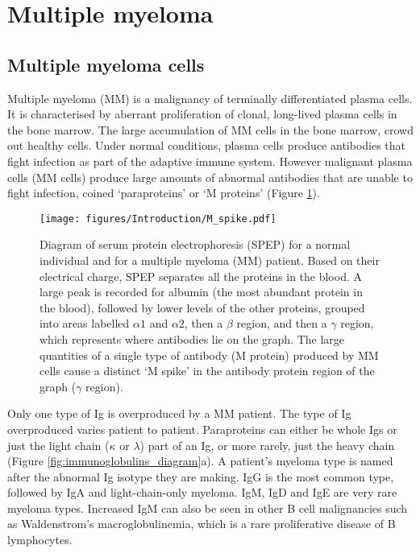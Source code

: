 \section{Multiple myeloma}\label{sec:MM}
\subsection{Multiple myeloma cells}
Multiple myeloma (MM) is a malignancy of terminally differentiated plasma cells.
It is characterised by aberrant proliferation of clonal, long-lived plasma cells in the bone marrow\cite{anderson2011pathogenesis}.
The large accumulation of MM cells in the bone marrow, crowd out healthy cells.
Under normal conditions, plasma cells produce antibodies that fight infection as part of the adaptive immune system.
However malignant plasma cells (MM cells) produce large amounts of abnormal antibodies that are unable to fight infection, coined `paraproteins' or `M proteins' (Figure \ref{fig:m_spike}).
%
\begin{figure}[htb]
\centering
\texttt{[image: figures/Introduction/M\_spike.pdf]}
\caption[M spike diagram]{Diagram of serum protein electrophoresis (SPEP) for a normal individual and for a multiple myeloma (MM) patient.
Based on their electrical charge, SPEP separates all the proteins in the blood.
A large peak is recorded for albumin (the most abundant protein in the blood), followed by lower levels of the other proteins, grouped into areas labelled $\alpha1$ and $\alpha2$, then a $\beta$ region, and then a $\gamma$ region, which represents where antibodies lie on the graph.
The large quantities of a single type of antibody (M protein) produced by MM cells cause a distinct `M spike' in the antibody protein region of the graph ($\gamma$ region).}
\label{fig:m_spike}
\end{figure}
Only one type of Ig is overproduced by a MM patient.
The type of Ig overproduced varies patient to patient.
Paraproteins can either be whole Igs or just the light chain ($\kappa$ or $\lambda$) part of an Ig, or more rarely, just the heavy chain (Figure \ref{fig:immunoglobulins_diagram}a).
A patient's myeloma type is named after the abnormal Ig isotype they are making.
IgG is the most common type, followed by IgA and light-chain-only myeloma.
IgM, IgD and IgE are very rare myeloma types\cite{cancerresearchuktypes}.
Increased IgM can also be seen in other B cell malignancies such as Waldenstrom's macroglobulinemia, which is a rare proliferative disease of B lymphocytes.

